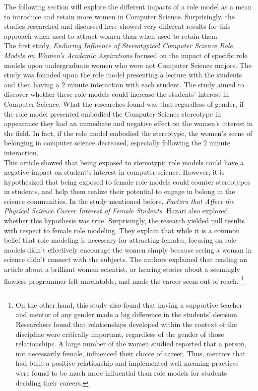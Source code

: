 \documentclass[12pt]{article}
\begin{document}
		The following section will explore the different impacts  of a role model as a mean to introduce and retain more women in Computer Science. Surprisingly, the studies researched and discussed here showed very different results for this approach when used to attract women than when used to retain them.  \\
		
		The first study, \textit{Enduring Influence of Stereotypical Computer Science Role Models on Women’s Academic Aspirations}\cite{typerolemodels} focused on the impact of specific role models upon undergraduate women who were not Computer Science majors. The study was founded upon the role model presenting a lecture with the students and then having a 2 minute interaction with each student. The study aimed to discover whether these role models could increase the students' interest in Computer Science. What the researches found was that regardless of gender, if the role model presented embodied the Computer Science stereotype in appearance they had an immediate and negative  effect on the women's interest in the field. In fact, if the role model embodied the stereotype, the women's scene of belonging in computer science decreased, especially following the 2 minute interaction.\\
		
		This article showed that being exposed to stereotypic role models could have a negative impact on student's interest in computer science. However, it is hypothesized that being exposed to female role models could counter stereotypes in students, and help them realize their potential to engage in belong in the science communities. In the study mentioned before, \textit{Factors that Affect the Physical Science Career Interest of Female Students}, Hazari also explored whether this hypothesis was true. Surprisingly, the research yielded null results with respect to female role modeling. They explain that while it is a common belief that role modeling is necessary for attracting females, focusing on role models didn't effectively encourage the women simply because  seeing a woman in science didn't connect with the subjects. The authors explained that reading an article about a brilliant woman scientist, or hearing stories about a seemingly flawless programmer felt unrelatable, and made the career seem out of reach. \footnote{On the other hand, this study also found that having a supportive teacher and mentor of any gender made a big difference in the students' decision. Researchers found that relationships developed within the context of the discipline were critically important, regardless of the gender of those relationships. A large number of the women studied reported that a person, not necessarily female, influenced their choice of career. Thus, mentors that had built a positive relationship and implemented well-meaning practices were found to be much more influential than role models for students deciding their careers.}\\
		
\end{document}
